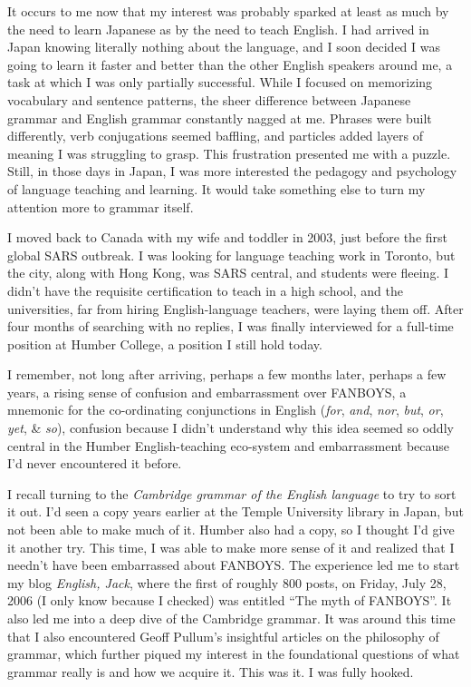 It occurs to me now that my interest was probably sparked at least as much by the need to learn Japanese as by the need to teach English. I had arrived in Japan knowing literally nothing about the language, and I soon decided I was going to learn it faster and better than the other English speakers around me, a task at which I was only partially successful. While I focused on memorizing vocabulary and sentence patterns, the sheer difference between Japanese grammar and English grammar constantly nagged at me. Phrases were built differently, verb conjugations seemed baffling, and particles added layers of meaning I was struggling to grasp. This frustration presented me with a puzzle. Still, in those days in Japan, I was more interested the pedagogy and psychology of language teaching and learning. It would take something else to turn my attention more to grammar itself.

\bigskip

I moved back to Canada with my wife and toddler in 2003, just before the first global SARS outbreak. I was looking for language teaching work in Toronto, but the city, along with Hong Kong, was SARS central, and students were fleeing. I didn't have the requisite certification to teach in a high school, and the universities, far from hiring English-language teachers, were laying them off. After four months of searching with no replies, I was finally interviewed for a full-time position at Humber College, a position I still hold today.

I remember, not long after arriving, perhaps a few months later, perhaps a few years, a rising sense of confusion and embarrassment over FANBOYS, a mnemonic for the co-ordinating conjunctions in English (\textit{for}, \textit{and}, \textit{nor}, \textit{but}, \textit{or}, \textit{yet}, \& \textit{so}), confusion because I didn't understand why this idea seemed so oddly central in the Humber English-teaching eco-system and embarrassment because I'd never encountered it before.

I recall turning to the \textit{Cambridge grammar of the English language} to try to sort it out. I'd seen a copy years earlier at the Temple University library in Japan, but not been able to make much of it. Humber also had a copy, so I thought I'd give it another try. This time, I was able to make more sense of it and realized that I needn't have been embarrassed about FANBOYS. The experience led me to start my blog \textit{English, Jack}, where the first of roughly 800 posts, on Friday, July 28, 2006 (I only know because I checked) was entitled ``The myth of FANBOYS''. It also led me into a deep dive of the Cambridge grammar. It was around this time that I also encountered Geoff Pullum's insightful articles on the philosophy of grammar, which further piqued my interest in the foundational questions of what grammar really is and how we acquire it. This was it. I was fully hooked.

